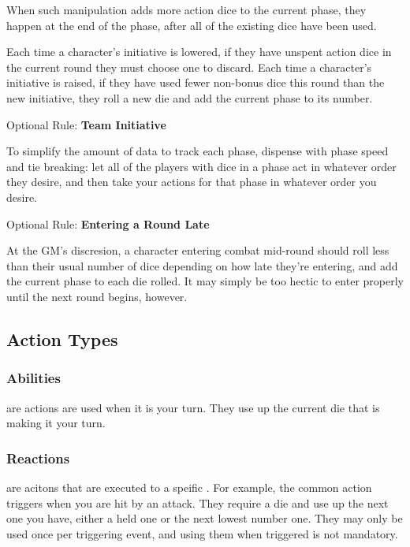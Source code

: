 \begin{multicols}{2}
         When such manipulation adds more action dice to the current phase, they happen at the end of the phase, after all of the existing dice have been used.

         Each time a character's initiative is lowered, if they have unspent action dice in the current round they must choose one to discard. Each time a character's initiative is raised, if they have used fewer non-bonus dice this round than the new initiative, they roll a new die and add the current phase to its number.

        \begin{boco}
            Optional Rule: \textbf{Team Initiative}\pc%

            To simplify the amount of data to track each phase, dispense with phase speed and tie breaking: let all of the players with dice in a phase act in whatever order they desire, and then take your actions for that phase in whatever order you desire.\pw%

             Optional Rule: \textbf{Entering a Round Late}\pc%

            At the GM's discresion, a character entering combat mid-round should roll less than their usual number of dice depending on how late they're entering, and add the current phase to each die rolled. It may simply be too hectic to enter properly until the next round begins, however.
        \end{boco}

    \subsection{Action Types}\label{subsec:actions}

        \subsubsection{Abilities}
             are actions are used when it is your turn. They use up the current die that is making it your turn.
        
        \subsubsection{Reactions}
             are acitons that are executed to a speific . For example, the common action  triggers when you are hit by an attack. They require a die and use up the next one you have, either a held one or the next lowest number one. They may only be used once per triggering event, and using them when triggered is not mandatory.


\end{multicols}
